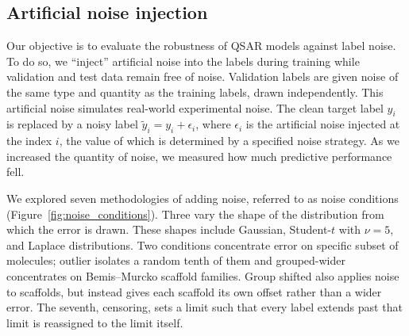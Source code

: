 \subsection{Artificial noise injection}\label{sec:noise_injection}

Our objective is to evaluate the robustness of QSAR models against label noise. To do so, we ``inject'' artificial noise into the labels during training while validation and test data remain free of noise. Validation labels are given noise of the same type and quantity as the training labels, drawn independently. This artificial noise simulates real-world experimental noise. The clean target label $y_i$ is replaced by a noisy label $\tilde{y}_i = y_i + \epsilon_i$, where $\epsilon_i$ is the artificial noise injected at the index $i$, the value of which is determined by a specified noise strategy. As we increased the quantity of noise, we measured how much predictive performance fell. 

We explored seven methodologies of adding noise, referred to as noise conditions (Figure~\ref{fig:noise_conditions}). Three vary the shape of the distribution from which the error is drawn. These shapes include Gaussian, Student-$t$ with $\nu = 5$, and Laplace distributions. Two conditions concentrate error on specific subset of molecules; outlier isolates a random tenth of them and grouped-wider concentrates on Bemis--Murcko scaffold families. Group shifted also applies noise to scaffolds, but instead gives each scaffold its own offset rather than a wider error. The seventh, censoring, sets a limit such that every label extends past that limit is reassigned to the limit itself. 

